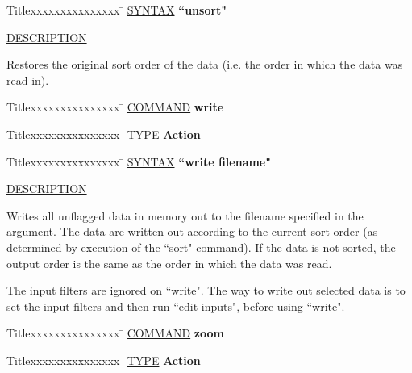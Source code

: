\begin{tabbing}
Titlexxxxxxxxxxxxxxx \= \kill
\underline{SYNTAX} \> {\bf 		``unsort"} \\
\end{tabbing}

\underline{DESCRIPTION}
\begin{list}{}{\setlength{\leftmargin}{0.5in}
     \setlength{\rightmargin}{0in}}
\item
Restores the original sort order of the data (i.e. the
order in which the data was read in).
\end{list}
\vspace{.2in}

\begin{tabbing}
Titlexxxxxxxxxxxxxxx \= \kill
\underline{COMMAND} \> {\bf 	write} \\
\end{tabbing}

\begin{tabbing}
Titlexxxxxxxxxxxxxxx \= \kill
\underline{TYPE} \> {\bf 		Action} \\
\end{tabbing}

\begin{tabbing}
Titlexxxxxxxxxxxxxxx \= \kill
\underline{SYNTAX} \> {\bf 		``write filename"} \\
\end{tabbing}

\underline{DESCRIPTION}
\begin{list}{}{\setlength{\leftmargin}{0.5in}
     \setlength{\rightmargin}{0in}}
\item
Writes all unflagged data in memory out to the filename
specified in the argument.  The data are written out
according to the current sort order (as determined by
execution of the ``sort" command).  If the data is not
sorted, the output order is the same as the order in
which the data was read.
\item
The input filters are ignored on ``write".
The way to write out selected data is to set the input
filters and then run ``edit inputs", before using ``write".
\end{list}
\vspace{.2in}

\begin{tabbing}
Titlexxxxxxxxxxxxxxx \= \kill
\underline{COMMAND} \> {\bf 	zoom} \\
\end{tabbing}

\begin{tabbing}
Titlexxxxxxxxxxxxxxx \= \kill
\underline{TYPE} \> {\bf 		Action} \\
\end{tabbing}

